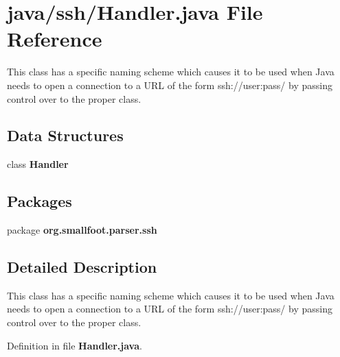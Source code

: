 \section{java/ssh/\+Handler.java File Reference}
\label{ssh_2Handler_8java}


This class has a specific naming scheme which causes it to be used when Java needs to open a connection to a U\+R\+L of the form ssh\+://user\+:pass/ by passing control over to the proper class.  


\subsection*{Data Structures}
\begin{DoxyCompactItemize}
\item 
class {\bf Handler}
\end{DoxyCompactItemize}
\subsection*{Packages}
\begin{DoxyCompactItemize}
\item 
package {\bf org.\+smallfoot.\+parser.\+ssh}
\end{DoxyCompactItemize}


\subsection{Detailed Description}
This class has a specific naming scheme which causes it to be used when Java needs to open a connection to a U\+R\+L of the form ssh\+://user\+:pass/ by passing control over to the proper class. 



Definition in file {\bf Handler.\+java}.

